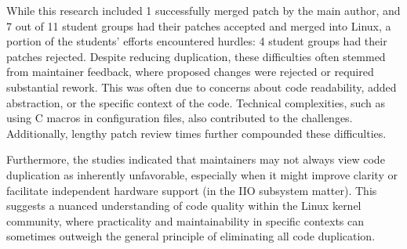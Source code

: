 \documentclass[10pt,conference]{IEEEtran}
\begin{document}
While this research included 1 successfully merged patch by the main author, and 7 out of 11 student groups had their patches accepted and merged into Linux, a portion of the students' efforts encountered hurdles: 4 student groups had their patches rejected.
Despite reducing duplication, these difficulties often stemmed from maintainer feedback, where proposed changes were rejected or required substantial rework. This was often due to concerns about code readability, added abstraction, or the specific context of the code. Technical complexities, such as using C macros in configuration files, also contributed to the challenges. Additionally, lengthy patch review times further compounded these difficulties.

Furthermore, the studies indicated that maintainers may not always view code duplication as inherently unfavorable, especially when it might improve clarity or facilitate independent hardware support (in the IIO subsystem matter). This suggests a nuanced understanding of code quality within the Linux kernel community, where practicality and maintainability in specific contexts can sometimes outweigh the general principle of eliminating all code duplication.






\end{document}
